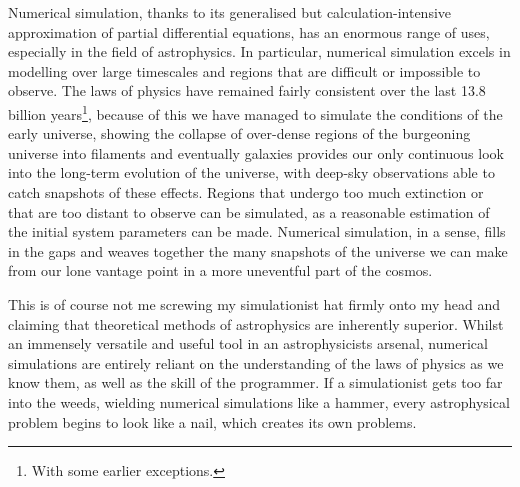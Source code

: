 Numerical simulation, thanks to its generalised but calculation-intensive approximation of partial differential equations, has an enormous range of uses, especially in the field of astrophysics.
In particular, numerical simulation excels in modelling over large timescales and regions that are difficult or impossible to observe.
The laws of physics have remained fairly consistent over the last 13.8 billion years\footnote{With some earlier exceptions.}, because of this we have managed to simulate the conditions of the early universe, showing the collapse of over-dense regions of the burgeoning universe into filaments and eventually galaxies provides our only continuous look into the long-term evolution of the universe, with deep-sky observations able to catch snapshots of these effects.
Regions that undergo too much extinction or that are too distant to observe can be simulated, as a reasonable estimation of the initial system parameters can be made.
Numerical simulation, in a sense, fills in the gaps and weaves together the many snapshots of the universe we can make from our lone vantage point in a more uneventful part of the cosmos.

This is of course not me screwing my simulationist hat firmly onto my head and claiming that theoretical methods of astrophysics are inherently superior.
Whilst an immensely versatile and useful tool in an astrophysicists arsenal, numerical simulations are entirely reliant on the understanding of the laws of physics as we know them, as well as the skill of the programmer.
If a simulationist gets too far into the weeds, wielding numerical simulations like a hammer, every astrophysical problem begins to look like a nail, which creates its own problems.


